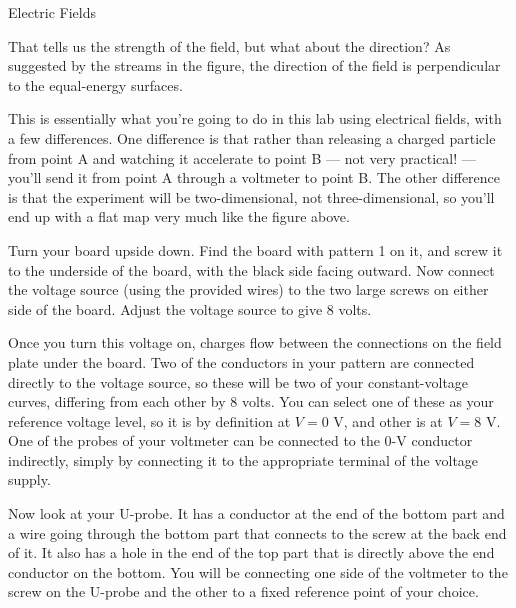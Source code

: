 \begin{lab}{Electric Fields}
\enlargethispage{-\baselineskip}


That tells us the strength of the field, but what about the direction? As suggested
by the streams in the figure, the direction of the field is perpendicular to the equal-energy
surfaces.

This is essentially what you're going to do in this lab using electrical fields, with
a few differences. One difference is that rather than releasing a charged particle from
point A and watching it accelerate to point B --- not very practical! --- you'll 
send it from point A through a voltmeter to point B. The other difference is that
the experiment will be two-dimensional, not three-dimensional, so you'll end up with
a flat map very much like the figure above.



Turn your  board upside down. Find the board
with pattern 1 on it, and screw
it to the underside of the board, with the
black side facing outward. Now connect the voltage source
(using the provided wires) to the two large screws on either
side of the board. Adjust the voltage source to give 8 volts.


Once you turn this voltage on, charges flow between the
connections on the field plate under the
board. Two of the conductors in your pattern are connected
directly to the voltage source, so these will be two of your
constant-voltage curves, differing from each other by 8 volts. You
can select one of these as your reference voltage level, so
it is by definition at $V=0$ V, and other is at $V=8$ V. One
of the probes of your voltmeter can be connected to the 0-V
conductor indirectly, simply by connecting it to the
appropriate terminal of the voltage supply.

Now look at your U-probe. It has a conductor at the end of
the bottom part and a wire going through the bottom part
that connects to the screw at the back end of it. It also
has a hole in the end of the top part that is directly above
the end conductor on the bottom. You will be connecting one
side of the voltmeter to the screw on the U-probe and the
other to a fixed reference point of your choice. 


\end{lab}
